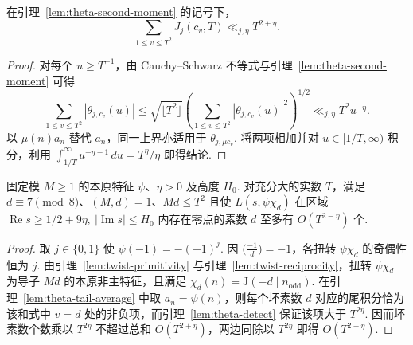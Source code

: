 \begin{lemma}
\label{lem:theta-tail-average}
\emitthmsource
在引理~\ref{lem:theta-second-moment} 的记号下，
\[
 \sum_{1\le v\le T^2}J_j(c_v,T)\ll_{j,\eta}T^{2+\eta}.
\]
\end{lemma}
\begin{proof}
对每个 $u\ge T^{-1}$，由 Cauchy--Schwarz 不等式与引理~\ref{lem:theta-second-moment} 可得
\[
 \sum_{1\le v\le T^2}|\theta_{j,c_v}(u)|
 \le \sqrt{\lfloor T^2\rfloor}
       \left(\sum_{1\le v\le T^2}|\theta_{j,c_v}(u)|^2\right)^{1/2}
 \ll_{j,\eta} T^2u^{-\eta}.
\]
以 $\mu(n)a_n$ 替代 $a_n$，同一上界亦适用于 $\theta_{j,\mu c_v}$. 将两项相加并对 $u\in[1/T,\infty)$ 积分，利用 $\int_{1/T}^\infty u^{-\eta-1}\,du=T^\eta/\eta$ 即得结论.
\end{proof}

\begin{lemma}[固定本原特征时的坏素数计数]
\label{lem:primitive-twist-count}
\emitthmsource
固定模 $M\ge1$ 的本原特征 $\psi$、$\eta>0$ 及高度 $H_0$. 对充分大的实数 $T$，满足 $d\equiv7\pmod8$、$(M,d)=1$、$Md\le T^2$ 且使 $L(s,\psi\chi_d)$ 在区域 $\operatorname{Re}s\ge1/2+9\eta,\ |\operatorname{Im}s|\le H_0$ 内存在零点的素数 $d$ 至多有 $O(T^{2-\eta})$ 个.
\end{lemma}
\begin{proof}
取 $j\in\{0,1\}$ 使 $\psi(-1)=-(-1)^j$. 因 $\bigl(\frac{-1}{d}\bigr)=-1$，各扭转 $\psi\chi_d$ 的奇偶性恒为 $j$. 由引理~\ref{lem:twist-primitivity} 与引理~\ref{lem:twist-reciprocity}，扭转 $\psi\chi_d$ 为导子 $Md$ 的本原非主特征，且满足 $\chi_d(n)=\mathrm J(-d\mid n_{\mathrm{odd}})$.
在引理~\ref{lem:theta-tail-average} 中取 $a_n=\psi(n)$，则每个坏素数 $d$ 对应的尾积分恰为该和式中 $v=d$ 处的非负项，而引理~\ref{lem:theta-detect} 保证该项大于 $T^{2\eta}$. 因而坏素数个数乘以 $T^{2\eta}$ 不超过总和 $O(T^{2+\eta})$，两边同除以 $T^{2\eta}$ 即得 $O(T^{2-\eta})$.
\end{proof}

